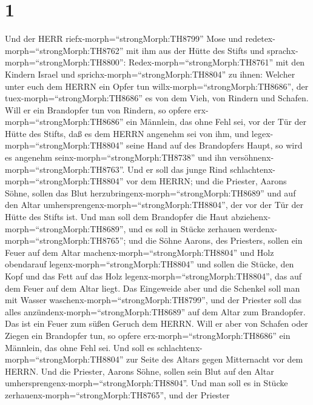 \hypertarget{section}{%
\section{1}\label{section}}

 Und der HERR riefx-morph=``strongMorph:TH8799'' Mose und
redetex-morph=``strongMorph:TH8762'' mit ihm aus der Hütte des Stifts
und sprachx-morph=``strongMorph:TH8800'': 
Redex-morph=``strongMorph:TH8761'' mit den Kindern Israel und
sprichx-morph=``strongMorph:TH8804'' zu ihnen: Welcher unter euch dem
HERRN ein Opfer tun willx-morph=``strongMorph:TH8686'', der
tuex-morph=``strongMorph:TH8686'' es von dem Vieh, von Rindern und
Schafen.  Will er ein Brandopfer tun von Rindern, so opfere
erx-morph=``strongMorph:TH8686'' ein Männlein, das ohne Fehl sei, vor
der Tür der Hütte des Stifts, daß es dem HERRN angenehm sei von ihm,
 und legex-morph=``strongMorph:TH8804'' seine Hand auf des
Brandopfers Haupt, so wird es angenehm
seinx-morph=``strongMorph:TH8738'' und ihn
versöhnenx-morph=``strongMorph:TH8763''.  Und er soll das
junge Rind schlachtenx-morph=``strongMorph:TH8804'' vor dem HERRN; und
die Priester, Aarons Söhne, sollen das Blut
herzubringenx-morph=``strongMorph:TH8689'' und auf den Altar
umhersprengenx-morph=``strongMorph:TH8804'', der vor der Tür der Hütte
des Stifts ist.  Und man soll dem Brandopfer die Haut
abziehenx-morph=``strongMorph:TH8689'', und es soll in Stücke zerhauen
werdenx-morph=``strongMorph:TH8765'';  und die Söhne Aarons,
des Priesters, sollen ein Feuer auf dem Altar
machenx-morph=``strongMorph:TH8804'' und Holz obendarauf
legenx-morph=``strongMorph:TH8804''  und sollen die Stücke,
den Kopf und das Fett auf das Holz legenx-morph=``strongMorph:TH8804'',
das auf dem Feuer auf dem Altar liegt.  Das Eingeweide aber
und die Schenkel soll man mit Wasser
waschenx-morph=``strongMorph:TH8799'', und der Priester soll das alles
anzündenx-morph=``strongMorph:TH8689'' auf dem Altar zum Brandopfer. Das
ist ein Feuer zum süßen Geruch dem HERRN.  Will er aber von
Schafen oder Ziegen ein Brandopfer tun, so opfere
erx-morph=``strongMorph:TH8686'' ein Männlein, das ohne Fehl sei.
 Und soll es schlachtenx-morph=``strongMorph:TH8804'' zur
Seite des Altars gegen Mitternacht vor dem HERRN. Und die Priester,
Aarons Söhne, sollen sein Blut auf den Altar
umhersprengenx-morph=``strongMorph:TH8804''.  Und man soll
es in Stücke zerhauenx-morph=``strongMorph:TH8765'', und der Priester
